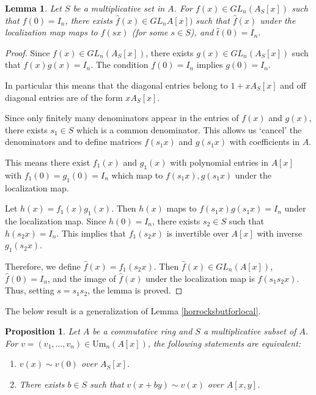 \documentclass[12pt]{report}
\numberwithin{equation}{section}
\newcounter{dummy} \numberwithin{dummy}{section}
\newtheorem{lemma}[dummy]{Lemma}
\newtheorem{proposition}[dummy]{Proposition}
\begin{document}
		
		\begin{lemma}\label{lemlocalglobal}
			Let $S$ be a multiplicative set in $A$. For $f(x) \in GL_n(A_S[x])$ such that $f(0) = I_n$, there exists $\hat{f}(x) \in GL_nA[x])$ such that $\hat{f}(x)$ under the localization map maps to $f(sx)$ (for some $s \in S$), and $\hat{t}(0) = I_n$.
		\end{lemma}
		
		\begin{proof}
			Since $f(x) \in GL_n(A_S[x])$, there exists $g(x) \in GL_n(A_S[x])$ such that $f(x)g(x) = I_n$. The condition $f(0) = I_n$ implies $g(0) = I_n$.
			
			In particular this means that the diagonal entries belong to $1 + xA_S[x]$ and off diagonal entries are of the form $x A_S[x]$.
			
			Since only finitely many denominators appear in the entries of $f(x)$ and $g(x)$, there exists $s_1 \in S$ which is a common denominator.  This allows us `cancel' the denominators and to define matrices $f(s_1 x)$ and $g(s_1 x)$ with coefficients in $A$. 
			
			This means there exist $f_1(x)$ and $g_1(x)$ with polynomial entries in $A[x]$ with $f_1(0) = g_1(0) = I_n$ which map to $f(s_1x), g(s_1x)$ under the localization map.
			
			Let $h(x) = f_1(x)g_1(x)$. Then $h(x)$ maps to $f(s_1x)g(s_1x) = I_n$ under the localization map. Since $h(0) = I_n$, there exists $s_2 \in S$ such that $h(s_2x) = I_n$.  This implies that $f_1(s_2x)$ is invertible over $A[x]$ with inverse $g_1(s_2x)$.
			
			Therefore, we define $\hat{f}(x) = f_1(s_2x)$.  Then $\hat{f}(x) \in GL_n(A[x])$, $\hat{f}(0) = I_n$, and the image of $\hat{f}(x)$ under the localization map is $f(s_1 s_2 x)$. Thus, setting $s = s_1 s_2$, the lemma is proved.
			\end{proof}
		
			The below result is a generalization of Lemma \ref{horrocksbutforlocal}.
	\begin{proposition}\label{generaliationoflocalhorrocks}
		Let $A$ be a commutative ring and $S$ a multiplicative subset of $A$. For $v = (v_1, \dots, v_n) \in \mathrm{Um}_n(A[x])$, the following statements are equivalent:
		\begin{enumerate}
			\item $v(x) \sim v(0)$ over $A_S[x]$.
			\item There exists $b \in S$ such that $v(x + by) \sim v(x)$ over $A[x, y]$.
		\end{enumerate}
	\end{proposition}
	
\end{document}
